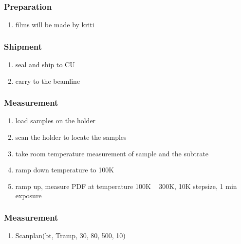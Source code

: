 \documentclass[prl,aps,tighten,amsmath,amssymb,floatfix]{revtex4-1}
\begin{document}
\subsubsection{Preparation}
\begin{enumerate}
    \item films will be made by kriti
\end{enumerate}

\subsubsection{Shipment}
\begin{enumerate}
    \item seal and ship to CU
    \item carry to the beamline
\end{enumerate}

\subsubsection{Measurement}
\begin{enumerate}
    \item load samples on the holder
    \item scan the holder to locate the samples
    \item take room temperature measurement of sample and the subtrate
    \item ramp down temperature to 100K
    \item ramp up, measure PDF at temperature 100K ~ 300K, 10K stepsize, 1 min exposure
\end{enumerate}

\subsubsection{Measurement}
\begin{enumerate}
    \item Scanplan(bt, Tramp, 30, 80, 500, 10)
\end{enumerate}
\end{document}
